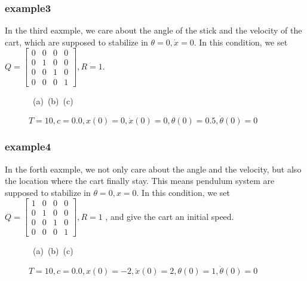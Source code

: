 \documentclass[a4paper,11pt]{article}
\begin{document}
\subsubsection{example3}
In the third eaxmple, we care about the angle of the stick and the velocity of the cart, which are supposed to stabilize in $\theta = 0,\dot{x} = 0$.
In this condition, we set 
$Q = \begin{bmatrix}
	0 & 0 &0  & 0\\
	0 & 1 &0  & 0\\
	0 & 0 & 1 & 0\\
	0 & 0 & 0 & 1
   \end{bmatrix}, R = 1$.
\begin{figure}[!hbt]
	\centering
	\mbox{
	(a) 
	(b)
	(c)
	}
	\vspace{15pt}
	\caption{$T=10, c=0.0, x(0) = 0, \dot{x}(0) = 0,\theta(0)=0.5, \dot{\theta}(0)=0$}
	\label{Figure:example3}
\end{figure}

\subsubsection{example4}
In the forth eaxmple, we not only care about the angle and the velocity, but also the location where the cart finally stay. 
This means pendulum system are supposed to stabilize in $\theta = 0, x = 0$. In this condition, we set 
$Q = \begin{bmatrix}
	1 & 0 &0  & 0\\
	0 & 1 &0  & 0\\
	0 & 0 & 1 & 0\\
	0 & 0 & 0 & 1
   \end{bmatrix}, R = 1$
, and give the cart an initial speed.
\begin{figure}[!hbt]
	\centering
	\mbox{
	(a)
	(b)
	(c)
	}
	\vspace{15pt}
	\caption{$T=10, c=0.0, x(0) = -2, \dot{x}(0) = 2,\theta(0)=1, \dot{\theta}(0)=0$}
	\label{Figure:example4}
\end{figure}
\end{document}
